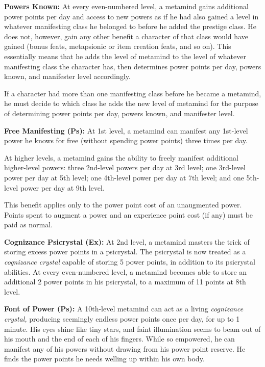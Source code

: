 \documentclass{article}
\begin{document}
\textbf{Powers Known: }At every even-numbered level, a metamind gains additional 
power points per day and access to new powers as if he had also gained a level 
in whatever manifesting class he belonged to before he added the prestige class. 
He does not, however, gain any other benefit a character of that class would have 
gained (bonus feats, metapsionic or item creation feats, and so on). This essentially 
means that he adds the level of metamind to the level of whatever manifesting class 
the character has, then determines power points per day, powers known, and manifester 
level accordingly.

If a character had more than one manifesting class before he became a metamind, 
he must decide to which class he adds the new level of metamind for the purpose 
of determining power points per day, powers known, and manifester level.

\textbf{Free Manifesting (Ps):} At 1st level, a metamind can manifest any 1st-level 
power he knows for free (without spending power points) three times per day.

At higher levels, a metamind gains the ability to freely manifest additional higher-level 
powers: three 2nd-level powers per day at 3rd level; one 3rd-level power per day 
at 5th level; one 4th-level power per day at 7th level; and one 5th-level power 
per day at 9th level.

This benefit applies only to the power point cost of an unaugmented power. Points 
spent to augment a power and an experience point cost (if any) must be paid as 
normal.

\textbf{Cognizance Psicrystal (Ex):} At 2nd level, a metamind masters the trick 
of storing excess power points in a psicrystal. The psicrystal is now treated as 
a \textit{cognizance crystal} capable of storing 5 power points, in addition to 
its psicrystal abilities. At every even-numbered level, a metamind becomes able 
to store an additional 2 power points in his psicrystal, to a maximum of 11 points 
at 8th level.

\textbf{Font of Power (Ps): }A 10th-level metamind can act as a living \textit{cognizance 
crystal, }producing seemingly endless power points once per day, for up to 1 minute. 
His eyes shine like tiny stars, and faint illumination seems to beam out of his 
mouth and the end of each of his fingers. While so empowered, he can manifest any 
of his powers without drawing from his power point reserve. He finds the power 
points he needs welling up within his own body.
\end{document}
